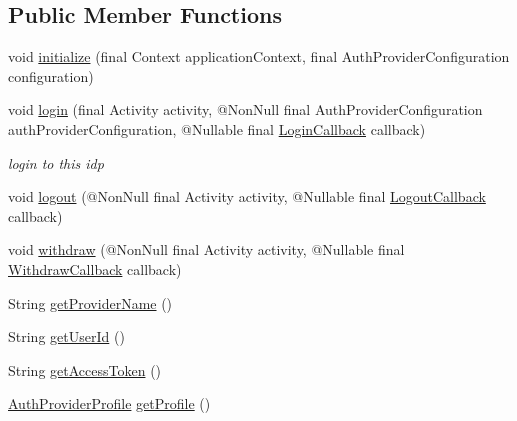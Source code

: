 \subsection*{Public Member Functions}
\begin{DoxyCompactItemize}
\item 
void \hyperlink{interfacecom_1_1toast_1_1android_1_1gamebase_1_1base_1_1auth_1_1_auth_provider_a923c7de30b5d052e5d108dbdf5aee7c9}{initialize} (final Context application\+Context, final Auth\+Provider\+Configuration configuration)
\item 
void \hyperlink{interfacecom_1_1toast_1_1android_1_1gamebase_1_1base_1_1auth_1_1_auth_provider_ad44dd6d1d209ecd0aae80ce889a5f741}{login} (final Activity activity, @Non\+Null final Auth\+Provider\+Configuration auth\+Provider\+Configuration, @Nullable final \hyperlink{interfacecom_1_1toast_1_1android_1_1gamebase_1_1base_1_1auth_1_1_auth_provider_1_1_login_callback}{Login\+Callback} callback)
\begin{DoxyCompactList}\small\item\em login to this idp \end{DoxyCompactList}\item 
void \hyperlink{interfacecom_1_1toast_1_1android_1_1gamebase_1_1base_1_1auth_1_1_auth_provider_a0304047092360f097193cfb90ac02dc1}{logout} (@Non\+Null final Activity activity, @Nullable final \hyperlink{interfacecom_1_1toast_1_1android_1_1gamebase_1_1base_1_1auth_1_1_auth_provider_1_1_logout_callback}{Logout\+Callback} callback)
\item 
void \hyperlink{interfacecom_1_1toast_1_1android_1_1gamebase_1_1base_1_1auth_1_1_auth_provider_add86ff01745407c2b77112ba7b4d20bb}{withdraw} (@Non\+Null final Activity activity, @Nullable final \hyperlink{interfacecom_1_1toast_1_1android_1_1gamebase_1_1base_1_1auth_1_1_auth_provider_1_1_withdraw_callback}{Withdraw\+Callback} callback)
\item 
String \hyperlink{interfacecom_1_1toast_1_1android_1_1gamebase_1_1base_1_1auth_1_1_auth_provider_ae151df64ed9709b56ffeba6ae4fe8c14}{get\+Provider\+Name} ()
\item 
String \hyperlink{interfacecom_1_1toast_1_1android_1_1gamebase_1_1base_1_1auth_1_1_auth_provider_a1a86b0102452494152fce9535952e4f4}{get\+User\+Id} ()
\item 
String \hyperlink{interfacecom_1_1toast_1_1android_1_1gamebase_1_1base_1_1auth_1_1_auth_provider_ae5d68509be41985a7f70a8fb907a576a}{get\+Access\+Token} ()
\item 
\hyperlink{classcom_1_1toast_1_1android_1_1gamebase_1_1base_1_1auth_1_1_auth_provider_profile}{Auth\+Provider\+Profile} \hyperlink{interfacecom_1_1toast_1_1android_1_1gamebase_1_1base_1_1auth_1_1_auth_provider_a5f70d0f45000c4b1a07474f3a4aba952}{get\+Profile} ()

\end{DoxyCompactItemize}
